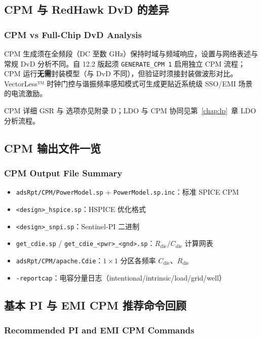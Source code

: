 \subsection{CPM 与 RedHawk DvD 的差异}
\subsubsection*{CPM vs Full-Chip DvD Analysis}

CPM 生成须在全频段（DC 至数 GHz）保持时域与频域响应，设置与网络表述与常规 DvD 分析不同。自 12.2 版起须 \texttt{GENERATE\_CPM 1} 启用独立 CPM 流程；CPM 运行\textbf{无需}封装模型（与 DvD 不同），但验证时须接封装做波形对比。VectorLess™ 时钟门控与谐振频率感知模式可生成更贴近系统级 SSO/EMI 场景的电流激励。

\begin{seeAlsoBox}
CPM 详细 GSR 与  选项亦见附录 D；LDO 与 CPM 协同见第~\ref{chap:lp}~章 LDO 分析流程。
\end{seeAlsoBox}

\subsection{CPM 输出文件一览}
\subsubsection*{CPM Output File Summary}

\begin{itemize}
  \item \texttt{adsRpt/CPM/PowerModel.sp} + \texttt{PowerModel.sp.inc}：标准 SPICE CPM
  \item \texttt{<design>\_hspice.sp}：HSPICE 优化格式
  \item \texttt{<design>\_snpi.sp}：Sentinel-PI 二进制
  \item \texttt{get\_cdie.sp} / \texttt{get\_cdie\_<pwr>\_<gnd>.sp}：$R_{\mathrm{die}}/C_{\mathrm{die}}$ 计算网表
  \item \texttt{adsRpt/CPM/apache.Cdie}：$1\times1$ 分区各频率 $C_{\mathrm{die}}$、$R_{\mathrm{die}}$
  \item \texttt{-reportcap}：电容分量日志（intentional/intrinsic/load/grid/well）
\end{itemize}

\subsection{基本 PI 与 EMI CPM 推荐命令回顾}
\subsubsection*{Recommended PI and EMI CPM Commands}

